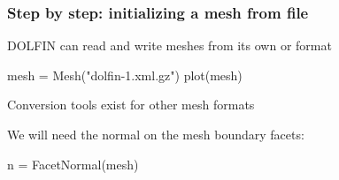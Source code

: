 \begin{frame}[fragile]
  \frametitle{Step by step: initializing a mesh from file}

  DOLFIN can read and write meshes from its own  or
   format
  \vspace{-1em}
  \begin{python}
mesh = Mesh("dolfin-1.xml.gz")
plot(mesh)
  \end{python}

  Conversion tools exist for other mesh formats
  \vspace{-1em}

  We will need the normal on the mesh boundary facets:
  \vspace{-1em}
  \begin{python}
n = FacetNormal(mesh)
  \end{python}

\end{frame}
